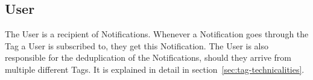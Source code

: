 \subsection{User}\label{sec:user}

The User is a recipient of Notifications.
Whenever a Notification
goes through the Tag a User is subscribed to,
they get this Notification.
The User is also responsible for
the deduplication of the Notifications,
should they arrive from multiple different Tags.
It is explained in detail in section~\ref{sec:tag-technicalities}.
